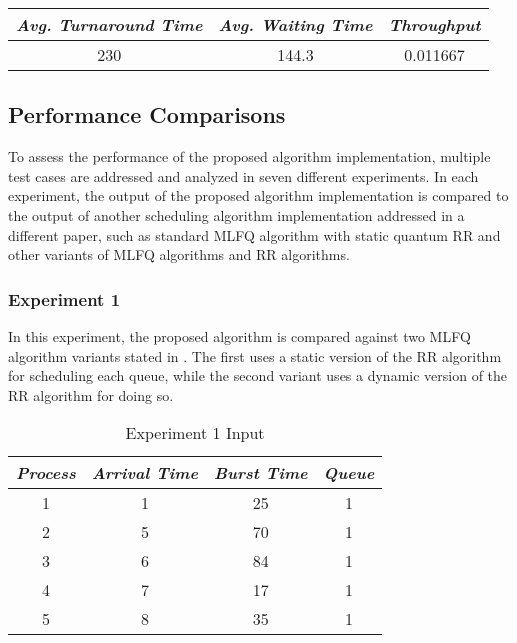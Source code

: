 \documentclass[conference]{IEEEtran}
\newcommand\T{\rule{0pt}{2.6ex}}       %
\newcommand\B{\rule[-1.2ex]{0pt}{0pt}} %
\begin{document}
\begin{table}[H]
    \caption{}
    \centering
     \begin{tabular}{||c c c||} 
     \hline
     \textit{\textbf{Avg. Turnaround Time}} & \textit{\textbf{Avg. Waiting Time}} & \textit{\textbf{Throughput}}\T \B \\ 
     \hline
     \hline
     230 & 144.3 & 0.011667 \T \B \\ 
     \hline
     \end{tabular}
\end{table}


\subsection{Performance Comparisons}

To assess the performance of the proposed algorithm implementation, multiple test cases are addressed and analyzed in seven different experiments. In each experiment, the output of the proposed algorithm implementation is compared to the output of another scheduling algorithm implementation addressed in a different paper, such as standard MLFQ algorithm with static quantum RR and other variants of MLFQ algorithms and RR algorithms.

\subsubsection{Experiment 1}

In this experiment, the proposed algorithm is compared against two MLFQ algorithm variants stated in \cite{b4}. The first uses a static version of the RR algorithm for scheduling each queue, while the second variant uses a dynamic version of the RR algorithm for doing so.

\begin{table}[H]
    \caption{Experiment 1 Input}
    \centering
     \begin{tabular}{||c c c c||} 
     \hline
     \textit{\textbf{Process}} & \textit{\textbf{Arrival Time}} & \textit{\textbf{Burst Time}} & \textit{\textbf{Queue}} \T \B \\ 
     \hline
     \hline
     1 & 1 & 25 & 1 \T \B \\ 
     \hline
     2 & 5 & 70 & 1 \T \B \\
     \hline
     3 & 6 & 84 & 1 \T \B \\
     \hline
     4 & 7 & 17 & 1 \T \B \\
     \hline
     5 & 8 & 35 & 1 \T \B \\ 
     \hline
     \end{tabular}
\end{table}
\end{document}
